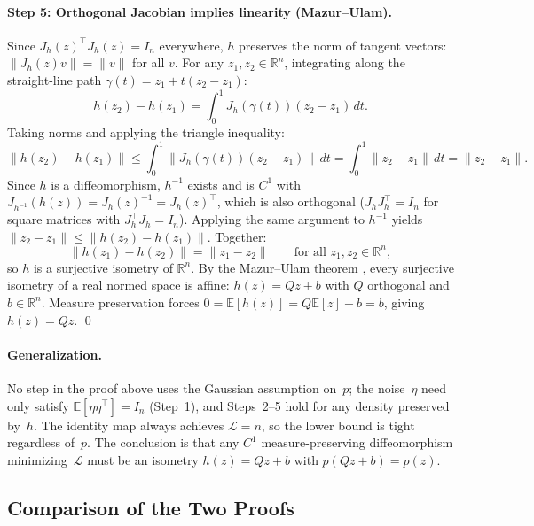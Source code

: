 \paragraph{Step 5: Orthogonal Jacobian implies linearity (Mazur--Ulam).}
Since $J_h(z)^\top J_h(z) = I_n$ everywhere, $h$ preserves the norm of tangent vectors: $\|J_h(z) v\| = \|v\|$ for all $v$. For any $z_1, z_2 \in \mathbb{R}^n$, integrating along the straight-line path $\gamma(t) = z_1 + t(z_2 - z_1)$:
\begin{equation}
    h(z_2) - h(z_1) = \int_0^1 J_h(\gamma(t))(z_2 - z_1)\,dt.
\end{equation}
Taking norms and applying the triangle inequality:
\begin{equation}
    \|h(z_2) - h(z_1)\| \leq \int_0^1 \|J_h(\gamma(t))(z_2-z_1)\|\,dt = \int_0^1 \|z_2-z_1\|\,dt = \|z_2-z_1\|.
\end{equation}
Since $h$ is a diffeomorphism, $h^{-1}$ exists and is $C^1$ with $J_{h^{-1}}(h(z)) = J_h(z)^{-1} = J_h(z)^\top$, which is also orthogonal ($J_h J_h^\top = I_n$ for square matrices with $J_h^\top J_h = I_n$). Applying the same argument to $h^{-1}$ yields $\|z_2 - z_1\| \leq \|h(z_2) - h(z_1)\|$. Together:
\begin{equation}
    \|h(z_1) - h(z_2)\| = \|z_1 - z_2\| \qquad \text{for all } z_1, z_2 \in \mathbb{R}^n,
\end{equation}
so $h$ is a surjective isometry of $\mathbb{R}^n$. By the Mazur--Ulam theorem \citep{mazur1932}, every surjective isometry of a real normed space is affine: $h(z) = Qz + b$ with $Q$ orthogonal and $b \in \mathbb{R}^n$. Measure preservation forces $0 = \mathbb{E}[h(z)] = Q\mathbb{E}[z] + b = b$, giving $h(z) = Qz$. \qed

\paragraph{Generalization.}
No step in the proof above uses the Gaussian assumption on~$p$;
the noise~$\eta$ need only satisfy $\mathbb{E}[\eta\eta^\top] = I_n$
(Step~1), and Steps~2--5 hold for any density preserved by~$h$.
The identity map always achieves $\mathcal{L} = n$, so the
lower bound is tight regardless of~$p$.
The conclusion is that any $C^1$ measure-preserving
diffeomorphism minimizing~$\mathcal{L}$ must be an isometry
$h(z) = Qz + b$ with $p(Qz + b) = p(z)$.


\subsection{Comparison of the Two Proofs}

